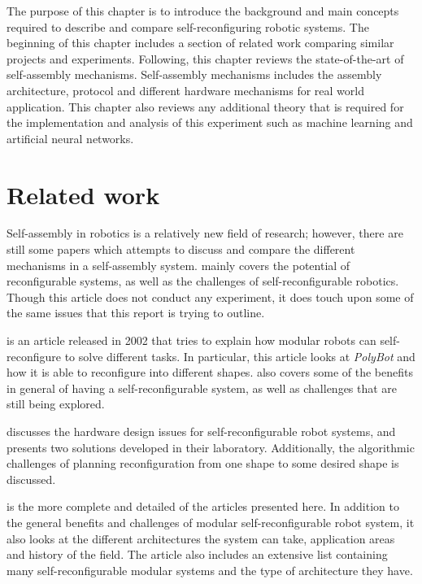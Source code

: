 The purpose of this chapter is to introduce the background and main concepts required to describe and compare self-reconfiguring robotic systems.
The beginning of this chapter includes a section of related work comparing similar projects and experiments.
Following, this chapter reviews the state-of-the-art of self-assembly mechanisms.
Self-assembly mechanisms includes the assembly architecture, protocol and different hardware mechanisms for real world application.
This chapter also reviews any additional theory that is required for the implementation and analysis of this experiment such as machine learning and artificial neural networks.

\section{Related work}
Self-assembly in robotics is a relatively new field of research; however, there are still some papers which attempts to discuss and compare the different mechanisms in a self-assembly system. 
\cite{murata_self-reconfigurable_2007} mainly covers the potential of reconfigurable systems, as well as the challenges of self-reconfigurable robotics. 
Though this article does not conduct any experiment, it does touch upon some of the same issues that this report is trying to outline.

\cite{yim_modular_2002} is an article released in 2002 that tries to explain how modular robots can self-reconfigure to solve different tasks. 
In particular, this article looks at \emph{PolyBot} and how it is able to reconfigure into different shapes. 
\cite{yim_modular_2002} also covers some of the benefits in general of having a self-reconfigurable system, as well as challenges that are still being explored.

\cite{rus_self-reconfiguring_2002} discusses the hardware design issues for self-reconfigurable robot systems, and presents two solutions developed in their laboratory.
Additionally, the algorithmic challenges of planning reconfiguration from one shape to some desired shape is discussed.

\cite{yim_modular_2007} is the more complete and detailed of the articles presented here. 
In addition to the general benefits and challenges of modular self-reconfigurable robot system, it also looks at the different architectures the system can take, application areas and history of the field.
The article also includes an extensive list containing many self-reconfigurable modular systems and the type of architecture they have.


